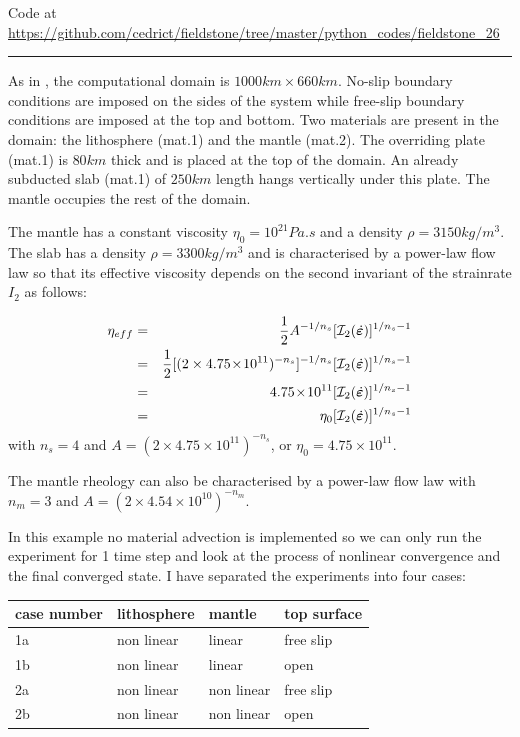 

\begin{center}
Code at \url{https://github.com/cedrict/fieldstone/tree/master/python_codes/fieldstone_26}
\end{center}

\par\noindent\rule{\textwidth}{0.4pt}

As in \cite{schm11}, the computational domain is $1000km \times 660km$.
No-slip boundary conditions are imposed on the sides of the system while free-slip
boundary conditions are imposed at the top and bottom.
Two materials are present in the domain: the lithosphere (mat.1) and the mantle (mat.2). 
The overriding plate (mat.1) is $80km$ thick and is placed at the top of the domain. 
An already subducted slab (mat.1) of $250km$ length hangs vertically under this plate.
The mantle occupies the rest of the domain.

The mantle has a constant viscosity $\eta_0=10^{21}Pa.s$ and a density $\rho=3150kg/m^3$. 
The slab has a density $\rho=3300kg/m^3$ and is characterised by a power-law flow law so that 
its effective viscosity depends on the second invariant of the strainrate $I_2$ as follows:

\begin{eqnarray}
\eta_{eff}
&=&\frac{1}{2} A^{-1/n_s} [{\cal I}_2(\dot{\bm \varepsilon})]^{1/n_s-1}  \\
&=&\frac{1}{2} [(2 \times 4.75\!\times\! 10^{11})^{-n_s}]^{-1/n_s} [{\cal I}_2(\dot{\bm \varepsilon})]   ^{1/n_s-1} \\
&=&4.75\!\times\! 10^{11} [{\cal I}_2(\dot{\bm \varepsilon})]^{1/n_s-1}  \\
&=& \eta_0 [{\cal I}_2(\dot{\bm \varepsilon})]^{1/n_s-1} 
\end{eqnarray}
with 
$n_s=4$ and $A=(2 \times 4.75\!\times\! 10^{11})^{-n_s}$, or $\eta_0=4.75\times 10^{11}$.


The mantle rheology can also be characterised by a power-law flow law with 
$n_m=3$ and $A=(2 \times 4.54\!\times\! 10^{10})^{-n_m}$.

In this example no material advection is implemented so we can only run the experiment for 1
time step and look at the process of nonlinear convergence and the final converged state.
I have separated the experiments into four cases:
\begin{center}
\begin{tabular}{llll}
\hline
case number & lithosphere & mantle & top surface \\
\hline\hline
1a & non linear & linear     & free slip  \\
1b & non linear & linear     & open\\
2a & non linear & non linear & free slip\\
2b & non linear & non linear & open \\ 
\hline
\end{tabular}
\end{center}

